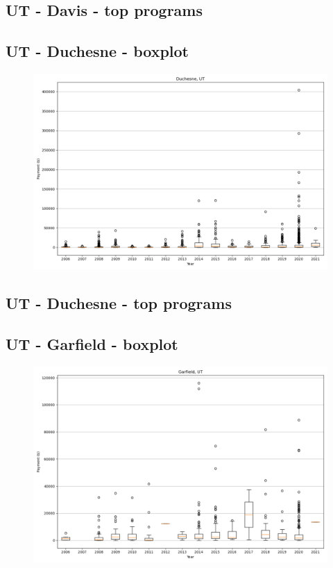 \subsection*{UT - Davis - top programs}

\newpage
\subsection*{UT - Duchesne - boxplot}
\begin{figure}[h]
\centering
\includegraphics[width=7in]{../output/boxplots/counties/Duchesne-UT_boxplot.png}
\end{figure}


\subsection*{UT - Duchesne - top programs}

\newpage
\subsection*{UT - Garfield - boxplot}
\begin{figure}[h]
\centering
\includegraphics[width=7in]{../output/boxplots/counties/Garfield-UT_boxplot.png}
\end{figure}



